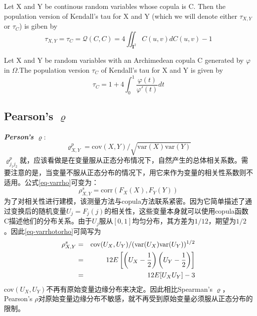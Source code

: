 \begin{theorem}
    Let X and Y be continous random variables whose copula is C. Then the population version of Kendall's tau for X and Y (which we will denote either $\tau_{X,Y}$ or $\tau_C$) is giben by
    \begin{equation}
        \tau_{X,Y} = \tau_C = \mathcal{Q}(C,C) = 4 \iint_{\mathbf{I}^2} C(u,v)dC(u,v)-1
        \label{eq-tau1}
    \end{equation}
    \label{thr-tau}
\end{theorem}

\begin{corollary}
    Let X and Y be random variables with an Archimedean copula C generated by $\varphi$ in $\Omega$.The population version $\tau_C$ of Kendall's tau for X and Y is given by
    \begin{equation}
        \tau_C = 1+4\int_0^1\dfrac{\varphi(t)}{\varphi'(t)}dt
        \label{eq5.1.9}
    \end{equation}
    \label{cor5.1.4}
\end{corollary}



\subsection{Pearson's $\varrho$}
\emph{\textbf{\textcolor[rgb]{1,0,0}{Person's $\varrho$}}}:
\begin{equation}   
    \label{eq-varrho}
    \varrho^{p}_{X,Y} = \text{cov}(X,Y)/\sqrt{\text{var}(X)\text{var}(Y)}
\end{equation}
$\varrho_{j_1 j_2}^{p}$就，应该看做是在变量服从正态分布情况下，自然产生的总体相关系数。需要注意的是，当变量不服从正态分布的情况下，用它来作为变量的相关性系数则不适用\cite{Smith2009}。公式\ref{eq-varrho}可变为：
\begin{equation}
    \rho_{X,Y}^s = \text{corr}(F_{X}(X),F_{Y}(Y))
    \label{eq-varrhotorho}
\end{equation}
为了对相关性进行建模，该测量方法与copula方法联系紧密。因为它简单描述了通过变换后的随机变量$U_j = F_j(j)$的相关性，这些变量本身就可以使用copula函数C描述他们的分布关系。\textcolor[rgb]{1,0,0}{由于$U_j$服从$[0,1]$均匀分布}，其方差为$1/12$，期望为$1/2$。因此\cref{eq-varrhotorho}可简写为
\begin{eqnarray}
    \rho_{X,Y}^s &=& \text{cov}(U_{X},U_{Y})/(\text{var}(U_{X})\text{var}(U_{Y}))^{1/2} \notag \\
    &=& 12E \left[ \left(U_{X} - \dfrac{1}{2}\right)\left(U_{Y} - \dfrac{1}{2}\right) \right] \notag \\
    &=& 12E [U_{X}U_{Y}] -3
    \label{eq-rhoSimplified}
\end{eqnarray}
cov$(U_X,U_Y)$不再有原始变量边缘分布来决定。因此相比Spearman's $\varrho$，Pearson's $\rho$对原始变量边缘分布不敏感，就不再受到原始变量必须服从正态分布的限制。


